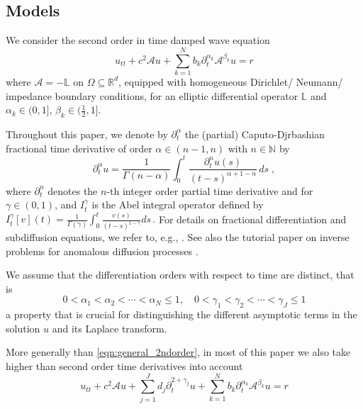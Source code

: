 \subsection{Models} \label{sec:models}
We consider the second order in time damped wave equation
\begin{equation}\label{eqn:general_2ndorder}
u_{tt}+c^2\mathcal{A}u+\sum_{k=1}^N b_k \partial_t^{\alpha_k} \mathcal{A}^{\beta_k}u=r
\end{equation}
where $\mathcal{A}=-\mathbb{L}$ on $\Omega\subseteq\mathbb{R}^d$, equipped with homogeneous Dirichlet/ Neumann/ impedance boundary conditions, for an elliptic differential operator $\mathbb{L}$ and 
$\alpha_k\in(0,1]$, $\beta_{k}\in(\frac12,1]$.

Throughout this paper, we denote by $\partial_t^\alpha$ the (partial) Caputo-Djrbashian fractional time derivative of order $\alpha\in(n-1,n)$ with $n\in\mathbb{N}$ by
\[
\partial_t^\alpha u  = \frac{1}{\Gamma(n-\alpha)}\int_{0}^{t}\frac{\partial^n_t u(s)}{(t-s)^{\alpha+1-n}}  \,ds\;,
\]
where $\partial^n_t$ denotes the $n$-th integer order partial time derivative and for
$\gamma\in(0,1)$, and $I_t^\gamma$ is the Abel integral operator defined by 
$
I_t^\gamma[v](t) = \frac{1}{\Gamma(\gamma)}\int_{0}^{t}\frac{v(s)}{(t-s)^{1-\gamma}}ds\,.
$
For details on fractional differentiation and subdiffusion equations,
we refer to, e.g.,
\cite{Dzjbashian:1966,Djrbashian:1993,
MainardiGorenflo:2000,SakamotoYamamoto:2011a,SamkoKilbasMarichev:1993}.
See also the tutorial paper on inverse problems for anomalous diffusion processes
\cite{JinRundell:2015}.

We assume that the differentiation orders with respect to time are distinct, that is
\begin{equation}\label{eqn:alphas_distinct}
0<\alpha_1<\alpha_2<\cdots<\alpha_N\leq1,\quad
0<\gamma_1<\gamma_2<\cdots<\gamma_J\leq1
\end{equation}
a property that is crucial for distinguishing the different asymptotic terms in the solution $u$ and its Laplace transform.

More generally than \eqref{eqn:general_2ndorder},
in most of this paper we also take higher than second order time derivatives into account
\begin{equation}\label{eqn:general}
u_{tt}+c^2\mathcal{A}u+\sum_{j=1}^J d_j\partial_t^{2+\gamma_j}u+\sum_{k=1}^N b_k \partial_t^{\alpha_k} \mathcal{A}^{\beta_k}u=r
\end{equation}

